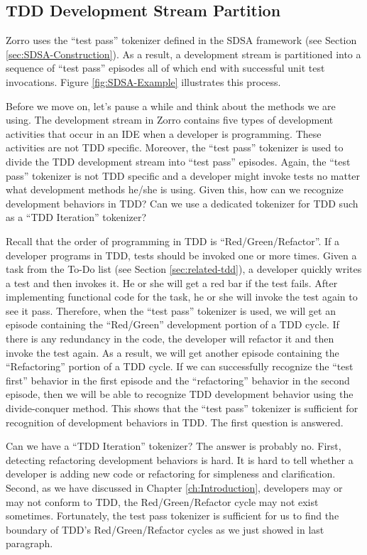 \subsection{TDD Development Stream Partition}
Zorro uses the ``test pass'' tokenizer defined in the SDSA 
framework (see Section \ref{sec:SDSA-Construction}). As a 
result, a development stream is partitioned into a sequence 
of ``test pass'' episodes all of which end with successful 
unit test invocations. Figure \ref{fig:SDSA-Example} 
illustrates this process.

Before we move on, let's pause a while and think about the 
methods we are using. The development stream in Zorro 
contains five types of development activities that occur 
in an IDE when a developer is programming. These 
activities are not TDD specific. Moreover, the ``test
pass'' tokenizer is used to divide the TDD development stream
into ``test pass'' episodes. Again, the ``test pass'' tokenizer 
is not TDD specific and a developer might invoke tests no matter what
development methods he/she is using. Given this, how can we 
recognize development behaviors in TDD?  Can we use a dedicated 
tokenizer for TDD such as a ``TDD Iteration'' tokenizer? 

Recall that the order of programming in TDD is 
``Red/Green/Refactor''. If a developer programs in TDD, tests 
should be invoked one or more times. Given a task from the To-Do 
list (see Section \ref{sec:related-tdd}), a developer quickly 
writes a test and then invokes it. He or she will get a red
bar if the test fails. After implementing functional code 
for the task, he or she will invoke the test again to see it 
pass. Therefore, when the ``test pass'' tokenizer 
is used, we will get an episode containing the ``Red/Green'' 
development portion of a TDD cycle. If there is any redundancy
in the code, the developer will refactor it and then invoke
the test again. As a result, we will get another episode 
containing the ``Refactoring'' portion of a TDD cycle. If we 
can successfully recognize the ``test first'' behavior in the 
first episode and the ``refactoring'' behavior in the second 
episode, then we will be able to recognize TDD development 
behavior using the divide-conquer method. This shows that 
the ``test pass'' tokenizer is sufficient for recognition of 
development behaviors in TDD. The first question is answered. 

Can we have a ``TDD Iteration'' tokenizer? The answer is 
probably no. First, detecting refactoring development 
behaviors is hard. It is hard to tell whether a developer
is adding new code or refactoring for simpleness and clarification.
Second, as we have discussed in Chapter \ref{ch:Introduction}, 
developers may or may not conform to TDD, the Red/Green/Refactor 
cycle may not exist sometimes. Fortunately, the test pass tokenizer 
is sufficient for us to find the boundary of TDD's 
Red/Green/Refactor cycles as we just showed in last 
paragraph. 

